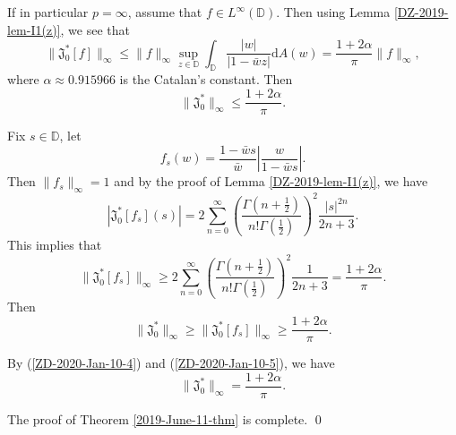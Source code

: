 \documentclass[a4paper,12pt]{amsart}
\theoremstyle{definition}
\numberwithin{equation}{section}
\newcommand{\ID}{{\mathbb D}}
\def\be{\begin{equation}}
\def\ee{\end{equation}}
\begin{document}
If in particular $p=\infty$, assume that $f\in L^{\infty}(\ID)$. Then using Lemma \ref{DZ-2019-lem-I1(z)}, we see that
$$\|\mathfrak{J}_0^*[f]\|_{\infty}\leq\|f\|_{\infty}\sup\limits_{z\in\ID}\int_{\ID}\frac{|w|}{|1-\bar{w}z|}\mathrm{d}A(w) =\frac{1+2\alpha}{\pi}\|f\|_{\infty},$$
where $\alpha\approx 0.915966$ is the Catalan's constant.
Then
\be\label{ZD-2020-Jan-10-4}
\|\mathfrak{J}_0^*\|_{\infty}\leq\frac{1+2\alpha}{\pi}.
\ee

Fix $s\in\ID$, let
$$f_s(w)=\frac{1-\bar{w}s}{\bar{w}}\left|\frac{w}{1-\bar{w}s}\right|.$$
Then $\|f_s\|_{\infty}=1$ and by the proof of Lemma \ref{DZ-2019-lem-I1(z)}, we have
$$|\mathfrak{J}_0^*[f_s](s)| = 2\sum\limits_{n=0}^{\infty}\left(\frac{\Gamma(n+\frac{1}{2})}{n!\Gamma(\frac{1}{2})}\right)^2\frac{|s|^{2n}}{2n+3}.$$
This implies that $$\|\mathfrak{J}_0^*[f_s]\|_{\infty}\geq2\sum\limits_{n=0}^{\infty}\left(\frac{\Gamma(n+\frac{1}{2})}{n!\Gamma(\frac{1}{2})}\right)^2\frac{1}{2n+3}=\frac{1+2\alpha}{\pi}.$$
Then
\be\label{ZD-2020-Jan-10-5}
\|\mathfrak{J}_0^*\|_{\infty}\geq\|\mathfrak{J}_0^*[f_s]\|_{\infty}\geq\frac{1+2\alpha}{\pi}.
\ee

By (\ref{ZD-2020-Jan-10-4}) and (\ref{ZD-2020-Jan-10-5}), we have
$$\|\mathfrak{J}_0^*\|_{\infty}= \frac{1+2\alpha}{\pi}.$$

The proof of Theorem \ref{2019-June-11-thm} is complete. \qed
\end{document}
